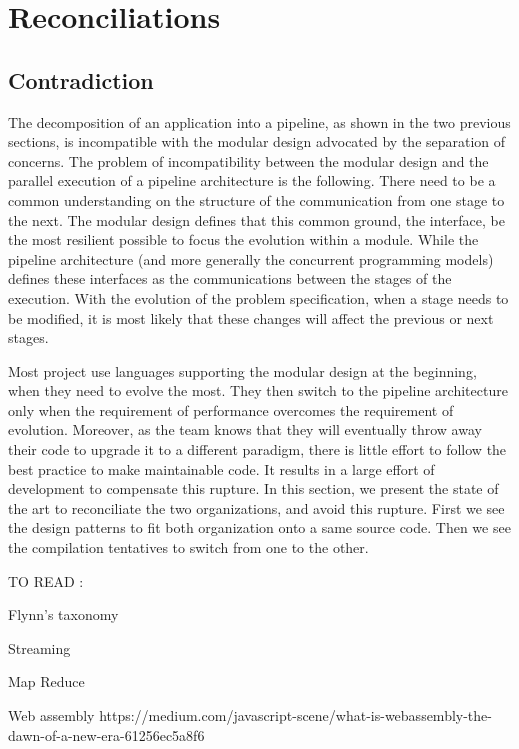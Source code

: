 \section{Reconciliations} \label{chapter3:reconciliations}

\subsection{Contradiction}

The decomposition of an application into a pipeline, as shown in the two previous sections, is incompatible with the modular design advocated by the separation of concerns.
The problem of incompatibility between the modular design and the parallel execution of a pipeline architecture is the following.
There need to be a common understanding on the structure of the communication from one stage to the next.
The modular design defines that this common ground, the interface, be the most resilient possible to focus the evolution within a module.
While the pipeline architecture (and more generally the concurrent programming models) defines these interfaces as the communications between the stages of the execution.
With the evolution of the problem specification, when a stage needs to be modified, it is most likely that these changes will affect the previous or next stages.

Most project use languages supporting the modular design at the beginning, when they need to evolve the most.
They then switch to the pipeline architecture only when the requirement of performance overcomes the requirement of evolution.
Moreover, as the team knows that they will eventually throw away their code to upgrade it to a different paradigm, there is little effort to follow the best practice to make maintainable code.
It results in a large effort of development to compensate this rupture.
In this section, we present the state of the art to reconciliate the two organizations, and avoid this rupture.
First we see the design patterns to fit both organization onto a same source code.
Then we see the compilation tentatives to switch from one to the other.










TO READ :

Flynn's taxonomy
\cite{Flynn1972}

Streaming
\cite{Madsen2015}
\cite{Sun2015}

Map Reduce
\cite{Yao2015}


Web assembly
https://medium.com/javascript-scene/what-is-webassembly-the-dawn-of-a-new-era-61256ec5a8f6